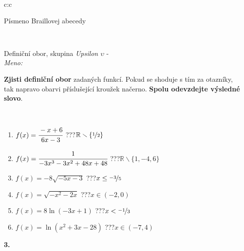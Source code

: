 \documentclass[10pt]{report}
\begin{document}
\begin{tabular}{c:c}
\begin{minipage}[c][104.5mm][t]{0.5\linewidth}
\begin{center}
\begin{minipage}{0.20\linewidth}
\begin{center}
{\small Písmeno Braillovej abecedy}
\end{center}
\end{minipage}
\end{center}
\end{minipage}
\\ \hdashline
\begin{minipage}[c][104.5mm][t]{0.5\linewidth}
\begin{center}
\vspace{7mm}
{\huge Definiční obor, skupina \textit{Upsilon $\upsilon$} -}\\[5mm]
\textit{Meno:}\phantom{xxxxxxxxxxxxxxxxxxxxxxxxxxxxxxxxxxxxxxxxxxxxxxxxxxxxxxxxxxxxxxxxx}\\[5mm]
\begin{minipage}{0.95\linewidth}
\textbf{Zjisti definiční obor} zadaných funkcí. Pokud se shoduje s tím za otazníky,\\tak napravo obarvi příslušející kroužek načerno. \textbf{Spolu odevzdejte výsledné slovo}.
\end{minipage}
\\[1mm]
\begin{minipage}{0.79\linewidth}
\begin{center}
\begin{varwidth}{\linewidth}
\begin{enumerate}
\normalsizerrr
\item $f(x)=\cfrac{-x+6}{6x-3}$\quad \dotfill\; ???\;\dotfill \quad $\mathbb{R}\smallsetminus\{\nicefrac{1}{2}\}$
\item $f(x)=\cfrac{1}{-3x^3-3x^2+48x+48}$\quad \dotfill\; ???\;\dotfill \quad $\mathbb{R}\smallsetminus\{1,-4,6\}$
\item $f(x)=-8\sqrt{-5x-3}$\quad \dotfill\; ???\;\dotfill \quad $x\leq\nicefrac{-3}{5}$
\item $f(x)=\sqrt{-x^2-2x}$\quad \dotfill\; ???\;\dotfill \quad $x\in(-2 , 0)$
\item $f(x)=8\ln{(-3x+1)}$\quad \dotfill\; ???\;\dotfill \quad $x<\nicefrac{-1}{3}$
\item $f(x)=\ln{(x^2+3x-28)}$\quad \dotfill\; ???\;\dotfill \quad $x\in(-7 , 4)$
\end{enumerate}
\end{varwidth}
\end{center}
\end{minipage}
\begin{minipage}{0.20\linewidth}
\begin{center}
{\Huge\bfseries 3.} \\[2mm]

\end{center}
\end{minipage}
\end{center}
\end{minipage}
\end{tabular}
\end{document}
